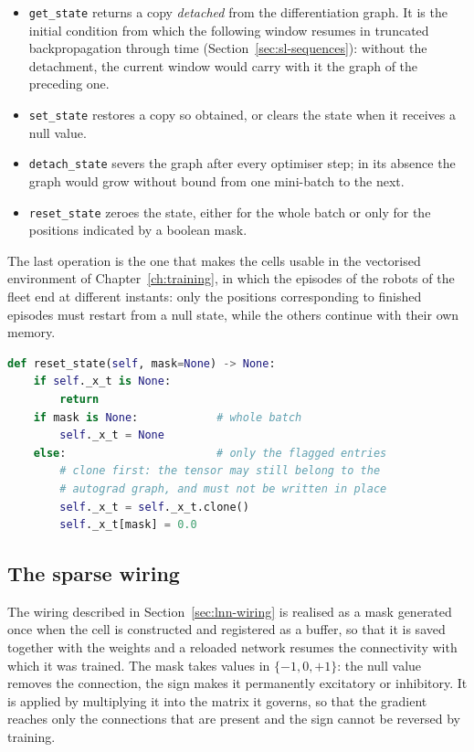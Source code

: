 \begin{itemize}
  \item \texttt{get\_state} returns a copy \emph{detached} from the
        differentiation graph. It is the initial condition from which the
        following window resumes in truncated backpropagation through time
        (Section~\ref{sec:sl-sequences}): without the detachment, the current
        window would carry with it the graph of the preceding one.
  \item \texttt{set\_state} restores a copy so obtained, or clears the state
        when it receives a null value.
  \item \texttt{detach\_state} severs the graph after every optimiser step; in
        its absence the graph would grow without bound from one mini-batch to
        the next.
  \item \texttt{reset\_state} zeroes the state, either for the whole batch or
        only for the positions indicated by a boolean mask.
\end{itemize}

The last operation is the one that makes the cells usable in the vectorised
environment of Chapter~\ref{ch:training}, in which the episodes of the robots of
the fleet end at different instants: only the positions corresponding to
finished episodes must restart from a null state, while the others continue with
their own memory.

\begin{lstlisting}[language=Python, caption={Selective reset of the recurrent state.}, label={lst:reset}]
def reset_state(self, mask=None) -> None:
    if self._x_t is None:
        return
    if mask is None:            # whole batch
        self._x_t = None
    else:                       # only the flagged entries
        # clone first: the tensor may still belong to the
        # autograd graph, and must not be written in place
        self._x_t = self._x_t.clone()
        self._x_t[mask] = 0.0
\end{lstlisting}

\subsection{The sparse wiring}

The wiring described in Section~\ref{sec:lnn-wiring} is realised as a mask
generated once when the cell is constructed and registered as a buffer, so that
it is saved together with the weights and a reloaded network resumes the
connectivity with which it was trained. The mask takes values in
$\{-1, 0, +1\}$: the null value removes the connection, the sign makes it
permanently excitatory or inhibitory. It is applied by multiplying it into the
matrix it governs, so that the gradient reaches only the connections that are
present and the sign cannot be reversed by training.

